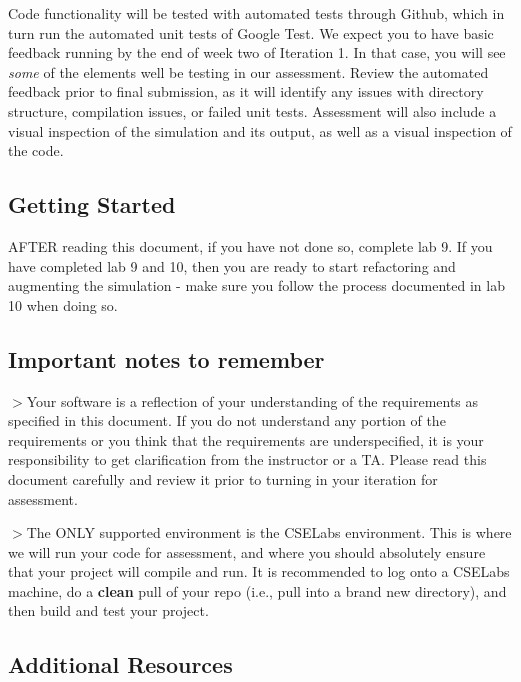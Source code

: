 Code functionality will be tested with automated tests through Github, which in turn run the automated unit tests of Google Test. We expect you to have basic feedback running by the end of week two of Iteration 1. In that case, you will see {\itshape some} of the elements we\textquotesingle{}ll be testing in our assessment. Review the automated feedback prior to final submission, as it will identify any issues with directory structure, compilation issues, or failed unit tests. Assessment will also include a visual inspection of the simulation and its output, as well as a visual inspection of the code.





\subsection*{Getting Started}

A\+F\+T\+ER reading this document, if you have not done so, complete lab 9. If you have completed lab 9 and 10, then you are ready to start refactoring and augmenting the simulation -\/ make sure you follow the process documented in lab 10 when doing so.





\subsection*{Important notes to remember}

$>$Your software is a reflection of your understanding of the requirements as specified in this document. If you do not understand any portion of the requirements or you think that the requirements are underspecified, it is your responsibility to get clarification from the instructor or a TA. Please read this document carefully and review it prior to turning in your iteration for assessment.

$>$The O\+N\+LY supported environment is the C\+S\+E\+Labs environment. This is where we will run your code for assessment, and where you should absolutely ensure that your project will compile and run. It is recommended to log onto a C\+S\+E\+Labs machine, do a {\bfseries clean} pull of your repo (i.\+e., pull into a brand new directory), and then build and test your project.





\subsection*{Additional Resources}

